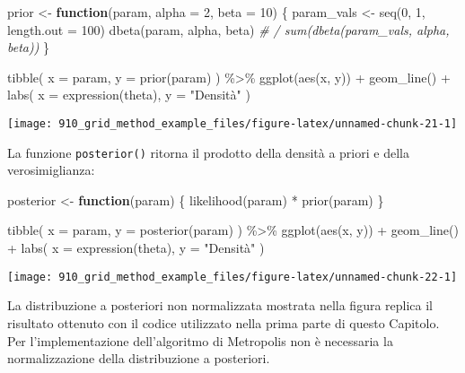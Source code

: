 \documentclass[
]{memoir}
\newenvironment{Shaded}{\begin{snugshade}}{\end{snugshade}}
\newcommand{\AttributeTok}[1]{\textcolor[rgb]{0.77,0.63,0.00}{#1}}
\newcommand{\CommentTok}[1]{\textcolor[rgb]{0.56,0.35,0.01}{\textit{#1}}}
\newcommand{\ControlFlowTok}[1]{\textcolor[rgb]{0.13,0.29,0.53}{\textbf{#1}}}
\newcommand{\DecValTok}[1]{\textcolor[rgb]{0.00,0.00,0.81}{#1}}
\newcommand{\FunctionTok}[1]{\textcolor[rgb]{0.00,0.00,0.00}{#1}}
\newcommand{\NormalTok}[1]{#1}
\newcommand{\OtherTok}[1]{\textcolor[rgb]{0.56,0.35,0.01}{#1}}
\newcommand{\SpecialCharTok}[1]{\textcolor[rgb]{0.00,0.00,0.00}{#1}}
\newcommand{\StringTok}[1]{\textcolor[rgb]{0.31,0.60,0.02}{#1}}
\begin{document}
\begin{Shaded}
\begin{Highlighting}[]
\NormalTok{prior }\OtherTok{\textless{}{-}} \ControlFlowTok{function}\NormalTok{(param, }\AttributeTok{alpha =} \DecValTok{2}\NormalTok{, }\AttributeTok{beta =} \DecValTok{10}\NormalTok{) \{}
\NormalTok{  param\_vals }\OtherTok{\textless{}{-}} \FunctionTok{seq}\NormalTok{(}\DecValTok{0}\NormalTok{, }\DecValTok{1}\NormalTok{, }\AttributeTok{length.out =} \DecValTok{100}\NormalTok{)}
  \FunctionTok{dbeta}\NormalTok{(param, alpha, beta) }\CommentTok{\# / sum(dbeta(param\_vals, alpha, beta))}
\NormalTok{\}}

\FunctionTok{tibble}\NormalTok{(}
  \AttributeTok{x =}\NormalTok{ param, }
  \AttributeTok{y =} \FunctionTok{prior}\NormalTok{(param)}
\NormalTok{) }\SpecialCharTok{\%\textgreater{}\%}
  \FunctionTok{ggplot}\NormalTok{(}\FunctionTok{aes}\NormalTok{(x, y)) }\SpecialCharTok{+}
  \FunctionTok{geom\_line}\NormalTok{() }\SpecialCharTok{+}
  \FunctionTok{labs}\NormalTok{(}
    \AttributeTok{x =} \FunctionTok{expression}\NormalTok{(theta),}
    \AttributeTok{y =} \StringTok{"Densità"}
\NormalTok{  )}
\end{Highlighting}
\end{Shaded}

\begin{center}\texttt{[image: 910\_grid\_method\_example\_files/figure-latex/unnamed-chunk-21-1]} \end{center}

La funzione \texttt{posterior()} ritorna il prodotto della densità a priori e della verosimiglianza:

\begin{Shaded}
\begin{Highlighting}[]
\NormalTok{posterior }\OtherTok{\textless{}{-}} \ControlFlowTok{function}\NormalTok{(param) \{}
  \FunctionTok{likelihood}\NormalTok{(param) }\SpecialCharTok{*} \FunctionTok{prior}\NormalTok{(param)}
\NormalTok{\}}

\FunctionTok{tibble}\NormalTok{(}
  \AttributeTok{x =}\NormalTok{ param, }
  \AttributeTok{y =} \FunctionTok{posterior}\NormalTok{(param)}
\NormalTok{) }\SpecialCharTok{\%\textgreater{}\%}
  \FunctionTok{ggplot}\NormalTok{(}\FunctionTok{aes}\NormalTok{(x, y)) }\SpecialCharTok{+}
  \FunctionTok{geom\_line}\NormalTok{() }\SpecialCharTok{+}
  \FunctionTok{labs}\NormalTok{(}
    \AttributeTok{x =} \FunctionTok{expression}\NormalTok{(theta),}
    \AttributeTok{y =} \StringTok{"Densità"}
\NormalTok{  )}
\end{Highlighting}
\end{Shaded}

\begin{center}\texttt{[image: 910\_grid\_method\_example\_files/figure-latex/unnamed-chunk-22-1]} \end{center}

\noindent
La distribuzione a posteriori non normalizzata mostrata nella figura replica il risultato ottenuto con il codice utilizzato nella prima parte di questo Capitolo. Per l'implementazione dell'algoritmo di Metropolis non è necessaria la normalizzazione della distribuzione a posteriori.

  
\end{document}

